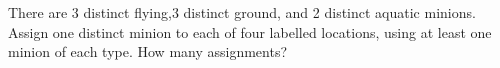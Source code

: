 There are 3 distinct flying,3 distinct ground, and 2 distinct aquatic minions. Assign one distinct minion to each of four labelled locations, using at least one minion of each type. How many assignments?
